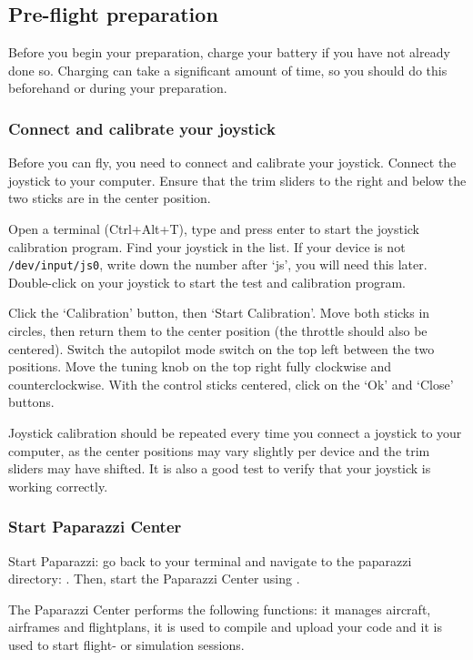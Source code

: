 \documentclass{article}
\begin{document}
\subsection*{Pre-flight preparation}
Before you begin your preparation, charge your battery if you have not already done so. Charging can take a significant amount of time, so you should do this beforehand or during your preparation.

\subsubsection*{Connect and calibrate your joystick}
Before you can fly, you need to connect and calibrate your joystick.
Connect the joystick to your computer. Ensure that the trim sliders to the right and below the two sticks are in the center position.

Open a terminal (Ctrl+Alt+T), type  and press enter to start the joystick calibration program. Find your joystick in the list. If your device is not \verb"/dev/input/js0", write down the number after `js', you will need this later. Double-click on your joystick to start the test and calibration program.

Click the `Calibration' button, then `Start Calibration'. Move both sticks in circles, then return them to the center position (the throttle should also be centered). Switch the autopilot mode switch on the top left between the two positions. Move the tuning knob on the top right fully clockwise and counterclockwise. With the control sticks centered, click on the `Ok' and `Close' buttons.

Joystick calibration should be repeated every time you connect a joystick to your computer, as the center positions may vary slightly per device and the trim sliders may have shifted. It is also a good test to verify that your joystick is working correctly.

\subsubsection*{Start Paparazzi Center}
Start Paparazzi: go back to your terminal and navigate to the paparazzi directory: . Then, start the Paparazzi Center using .

\medskip
The Paparazzi Center performs the following functions: it manages aircraft, airframes and flightplans, it is used to compile and upload your code and it is used to start flight- or simulation sessions.
\end{document}
